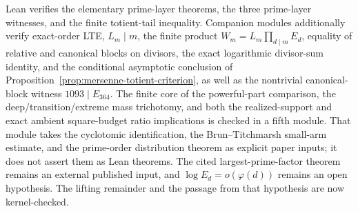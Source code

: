 Lean verifies the elementary prime-layer theorems, the three prime-layer
witnesses, and the finite totient-tail inequality.  Companion modules additionally
verify exact-order LTE, $L_m\mid m$, the finite product
$W_m=L_m\prod_{d\mid m}E_d$, equality of relative and canonical blocks on
divisors, the exact logarithmic divisor-sum identity, and the conditional
asymptotic conclusion of Proposition~\ref{prop:mersenne-totient-criterion},
as well as the nontrivial canonical-block witness $1093\mid E_{364}$.
The finite core of the powerful-part comparison, the deep/transition/extreme
mass trichotomy, and both the realized-support and exact ambient square-budget
ratio implications is checked in a
fifth module.  That module takes the cyclotomic identification, the
Brun--Titchmarsh small-arm estimate, and the prime-order distribution theorem
as explicit paper inputs; it does not assert them as Lean theorems.
The cited largest-prime-factor theorem remains an external published input,
and $\log E_d=o(\varphi(d))$ remains an open hypothesis.  The lifting
remainder and the passage from that hypothesis are now kernel-checked.
